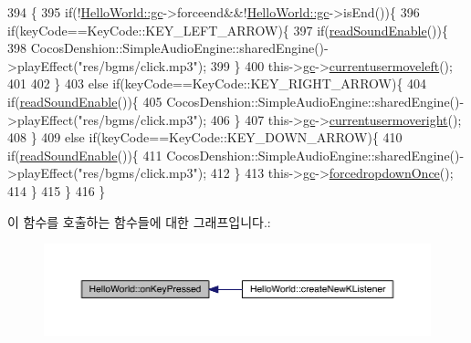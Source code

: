 \begin{DoxyCode}
394                                                                                      \{
395     \textcolor{keywordflow}{if}(!\hyperlink{class_hello_world_a547cb213126911d9a7151f8259dc7102}{HelloWorld::gc}->forceend&&!\hyperlink{class_hello_world_a547cb213126911d9a7151f8259dc7102}{HelloWorld::gc}->isEnd())\{
396         \textcolor{keywordflow}{if}(keyCode==KeyCode::KEY\_LEFT\_ARROW)\{
397             \textcolor{keywordflow}{if}(\hyperlink{class_hello_world_a0f8c9d1b95e03b397e680b9dafb8f3d9}{readSoundEnable}())\{
398             CocosDenshion::SimpleAudioEngine::sharedEngine()->playEffect(\textcolor{stringliteral}{"res/bgms/click.mp3"});
399             \}
400             this->\hyperlink{class_hello_world_a547cb213126911d9a7151f8259dc7102}{gc}->\hyperlink{class_tetris_1_1_game_controller_ac0d40a0936505754131099034b4271fa}{currentusermoveleft}();
401             
402         \}
403         \textcolor{keywordflow}{else} \textcolor{keywordflow}{if}(keyCode==KeyCode::KEY\_RIGHT\_ARROW)\{
404             \textcolor{keywordflow}{if}(\hyperlink{class_hello_world_a0f8c9d1b95e03b397e680b9dafb8f3d9}{readSoundEnable}())\{
405             CocosDenshion::SimpleAudioEngine::sharedEngine()->playEffect(\textcolor{stringliteral}{"res/bgms/click.mp3"});
406             \}
407             this->\hyperlink{class_hello_world_a547cb213126911d9a7151f8259dc7102}{gc}->\hyperlink{class_tetris_1_1_game_controller_a1d2859507cbc9bf9789753228cdedc1f}{currentusermoveright}();
408         \}
409         \textcolor{keywordflow}{else} \textcolor{keywordflow}{if}(keyCode==KeyCode::KEY\_DOWN\_ARROW)\{
410             \textcolor{keywordflow}{if}(\hyperlink{class_hello_world_a0f8c9d1b95e03b397e680b9dafb8f3d9}{readSoundEnable}())\{
411             CocosDenshion::SimpleAudioEngine::sharedEngine()->playEffect(\textcolor{stringliteral}{"res/bgms/click.mp3"});
412             \}
413             this->\hyperlink{class_hello_world_a547cb213126911d9a7151f8259dc7102}{gc}->\hyperlink{class_tetris_1_1_game_controller_a035e352a85db58a05322156af606f0fa}{forcedropdownOnce}();
414         \}
415     \}
416 \}
\end{DoxyCode}
이 함수를 호출하는 함수들에 대한 그래프입니다.\+:
\nopagebreak
\begin{figure}[H]
\begin{center}
\leavevmode
\includegraphics[width=350pt]{d9/d98/class_hello_world_af2d5a509259a5d0fce7770a38df371d3_icgraph}
\end{center}
\end{figure}
\mbox{\label{class_hello_world_acb7b8934f4697e752182a650a1dc7c3a}} 
